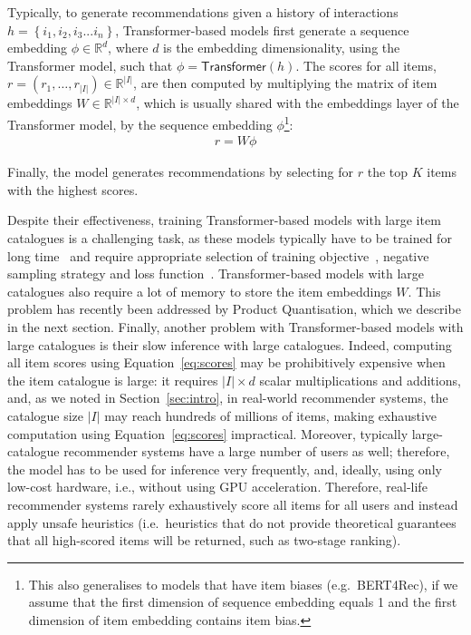 \documentclass[sigconf,natbib=true, review=true]{acmart} %
\newcommand{\argmax}{\operatornamewithlimits{\sf argmax}}
\begin{document}
Typically, to generate recommendations given a history of interactions $h = \left\{i_1, i_2, i_3 ... i_n\right\}$, Transformer-based models first generate a sequence embedding $\phi \in \mathbb{R}^d$, where $d$ is the embedding dimensionality, using the Transformer model, such that $\phi =  \textsf{Transformer}(h)$.
The scores for all items, $r = (r_1, \ldots, r_{|I|}) \in \mathbb{R}^{|I|}$, are then computed by multiplying the matrix of item embeddings $W \in \mathbb{R}^{|I|\times d}$, which is usually shared with the embeddings layer of the Transformer model, by the sequence embedding $\phi$\footnote{This also generalises to models that have item biases (e.g.\ BERT4Rec), if we assume that the first dimension of sequence embedding equals 1 and the first dimension of item embedding contains item bias.}:
\begin{align}
r = W\phi\label{eq:scores}
\end{align}

Finally, the model generates recommendations by selecting for $r$ the top $K$ items with the highest scores.%

Despite their effectiveness, training Transformer-based models with large item catalogues is a challenging task, as these models typically have to be trained for long time~\cite{Bert4RecRepro} and require appropriate selection of training objective~\cite{petrovRSSEffectiveEfficient2023}, negative sampling strategy and loss function~\cite{petrovGSASRecReducingOverconfidence2023,klenitskiyTurningDrossGold2023}.
%
Transformer-based models with large catalogues also require a lot of memory to store the item embeddings $W$. This problem has recently been addressed by Product Quantisation, which we describe in the next section. 
%
Finally, another problem with Transformer-based models with large catalogues is their slow inference with large catalogues. Indeed, computing all item scores using Equation~\eqref{eq:scores} may be prohibitively expensive when the item catalogue is large: it requires $|I|\times d$ scalar multiplications and additions, and, as we noted in Section~\ref{sec:intro},  in real-world recommender systems, the catalogue size $|I|$ may reach hundreds of millions of items, making exhaustive computation using Equation~\eqref{eq:scores} impractical. Moreover, typically large-catalogue recommender systems have a large number of users as well; therefore, the model has to be used for inference very frequently, and, ideally, using only low-cost hardware, i.e., without using GPU acceleration. Therefore, real-life recommender systems rarely exhaustively score all items for all users and instead apply unsafe heuristics (i.e.\ heuristics that do not provide theoretical guarantees that all high-scored items will be returned, such as two-stage ranking). 
 
\end{document}
